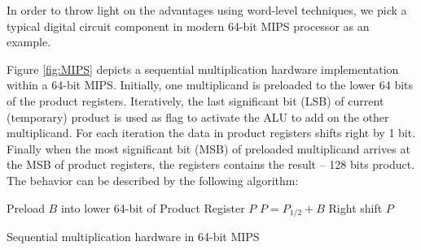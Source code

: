 In order to throw light on the advantages using word-level techniques, we pick a typical 
digital circuit component in modern 64-bit MIPS processor as an example.

\begin{Example}

\begin{figure}[H]
\end{figure}

Figure \ref{fig:MIPS} depicts a sequential multiplication hardware implementation within a 64-bit 
MIPS. Initially, one multiplicand is preloaded to the lower 64 bits of the product registers. 
Iteratively, the last significant bit (LSB) of current (temporary) product is used as flag to activate the ALU 
to add on the other multiplicand. For each iteration the data in product registers shifts right by 1 bit.
Finally when the most significant bit (MSB) of preloaded multiplicand arrives at the MSB of product registers,
the registers contains the result -- 128 bits product. The behavior can be described by the following algorithm:


\IncMargin{1em}
\begin{algorithm}[H]
\SetAlgoNoLine
\LinesNumbered
\Indm
\Indp

  Preload $B$ into lower 64-bit of Product Register $P$\;
  {
  	{
		$P = P_{1/2}+B$\;
	}
	Right shift $P$\;
  }
\caption {Sequential multiplication hardware in 64-bit MIPS}\label{alg:MIPS}
\end{algorithm}
\DecMargin{1em}


\end{Example}
